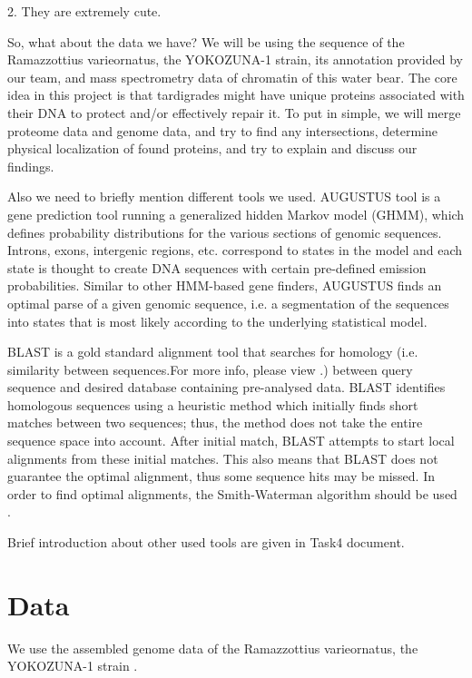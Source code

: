 \documentclass{article}
\begin{document}
 2. They are extremely cute. %
 
 So, what about the data we have? We will be using the sequence of the Ramazzottius varieornatus, the YOKOZUNA-1 strain, its annotation provided by our team, and mass spectrometry data of chromatin of this water bear. The core idea in this project is that tardigrades might have unique proteins associated with their DNA to protect and/or effectively repair it. To put in simple, we will merge proteome data and genome data, and try to find any intersections, determine physical localization of found proteins, and try to explain and discuss our findings.
 
 Also we need to briefly mention different tools we used. 
 AUGUSTUS tool is a gene prediction tool running a generalized hidden Markov model (GHMM), which defines probability distributions for the various sections of genomic sequences. Introns, exons, intergenic regions, etc. correspond to states in the model and each state is thought to create DNA sequences with certain pre-defined emission probabilities. Similar to other HMM-based gene finders, AUGUSTUS finds an optimal parse of a given genomic sequence, i.e. a segmentation of the sequences into states that is most likely according to the underlying statistical model. 
 
 BLAST is a gold standard alignment tool that searches for homology (i.e. similarity between sequences.For more info, please view \cite{4}.) between query sequence and desired database containing pre-analysed data. BLAST identifies homologous sequences using a heuristic method which initially finds short matches between two sequences; thus, the method does not take the entire sequence space into account. After initial match, BLAST attempts to start local alignments from these initial matches. This also means that BLAST does not guarantee the optimal alignment, thus some sequence hits may be missed. In order to find optimal alignments, the Smith-Waterman algorithm should be used \cite{2, 3}.
  
 Brief introduction about other used tools are given in Task4 document.
 
 
 \section{Data}
 We use the assembled genome data of the Ramazzottius varieornatus, the YOKOZUNA-1 strain \cite{data}. 
 
 
 
 
\end{document}
